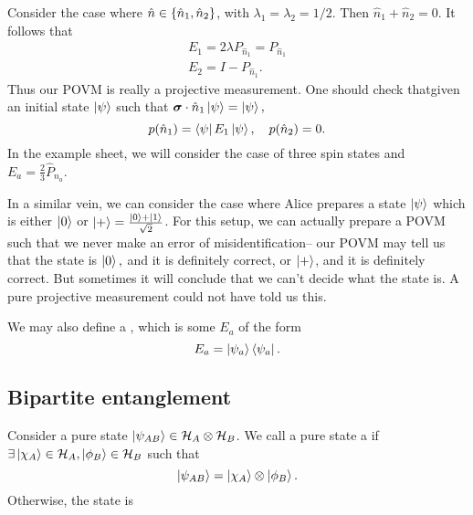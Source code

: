 \begin{exm}
    Consider the case where $\hat n\in \{\hat n_1,\hat n_2\}$,  with $\lambda_1=\lambda_2=1/2$. Then $\hat n_1 +\hat n_2=0$. It follows that
    \begin{gather}
        E_1 =2\lambda P_{\hat n_1}=P_{\hat n_1}\\
        E_2 = I-P_{\hat n_1}.
    \end{gather}
    Thus our POVM is really a projective measurement. One should check thatgiven an initial state $\left| \psi \right>$ such that $\mbox{\boldmath$ \sigma $} \cdot \hat n_1 \left| \psi \right>=\left| \psi \right>,$
    \begin{equation}
        p(\hat n_1)=\left< \psi \right|E_1 \left| \psi \right>, \quad p(\hat n_2)=0.
    \end{equation}
    In the example sheet, we will consider the case of three spin states and $E_a=\frac{2}{3} \hat P_{n_a}.$
\end{exm}

In a similar vein, we can consider the case where Alice prepares a state $\left| \psi \right>$ which is either $\left| 0 \right>$ or $\left| + \right>=\frac{\left| 0 \right>+\left| 1 \right>}{\sqrt{2}}$. For this setup, we can actually prepare a POVM such that we never make an error of misidentification-- our POVM may tell us that the state is $\left| 0 \right>,$ and it is definitely correct, or $\left| + \right>$, and it is definitely correct. But sometimes it will conclude that we can't decide what the state is. A pure projective measurement could not have told us this.

We may also define a , which is some $E_a$ of the form
\begin{equation*}
    E_a=\left| \psi_a \right>\left< \psi_a \right|.
\end{equation*}

\subsection*{Bipartite entanglement}
Consider a pure state $\left| \psi_{AB} \right>\in \mathcal H_A \otimes \mathcal H_B$. We call a pure state a  if $\exists \left| \chi_A \right> \in \mathcal H_A, \left| \phi_B \right>\in\mathcal H_B$ such that
\begin{equation}
    \left| \psi_{AB} \right>=\left| \chi_A \right>\otimes \left| \phi_B \right>.
\end{equation}
Otherwise, the state is 

